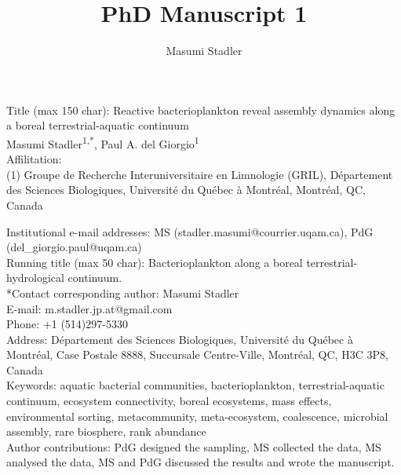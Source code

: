 \documentclass[12pt,a4paper]{article} %
\author{Masumi Stadler}
\title{PhD Manuscript 1}
\begin{document}

\setlength{\parindent}{0cm}
Title (max 150 char): Reactive bacterioplankton reveal assembly dynamics along a boreal terrestrial-aquatic continuum\\

Masumi Stadler\textsuperscript{1,*}, Paul A. del Giorgio\textsuperscript{1}\\

Affilitation:\\
(1) Groupe de Recherche Interuniversitaire en Limnologie (GRIL), D\'{e}partement des Sciences Biologiques, Universit\'{e} du Qu\'{e}bec \`{a} Montr\'{e}al, Montr\'{e}al, QC, Canada


Institutional e-mail addresses: MS (stadler.masumi@courrier.uqam.ca), PdG (del\_giorgio.paul@uqam.ca)\\

Running title (max 50 char): Bacterioplankton along a boreal terrestrial-hydrological continuum.\\

*Contact corresponding author: Masumi Stadler \\
E-mail: m.stadler.jp.at@gmail.com \\
Phone: +1 (514)297-5330 \\
Address: D\'{e}partement des Sciences Biologiques, Universit\'{e} du Qu\'{e}bec \`{a} Montr\'{e}al, Case Postale 8888, Succursale Centre-Ville, Montr\'{e}al, QC, H3C 3P8, Canada \\

Keywords: aquatic bacterial communities, bacterioplankton, terrestrial-aquatic continuum, ecosystem connectivity, boreal ecosystems, mass effects, environmental sorting, metacommunity, meta-ecosystem, coalescence, microbial assembly, rare biosphere, rank abundance\\

Author contributions: PdG designed the sampling, MS collected the data, MS analysed the data, MS and PdG discussed the results and wrote the manuscript.\\

\newpage

\doublespacing
\end{document}
